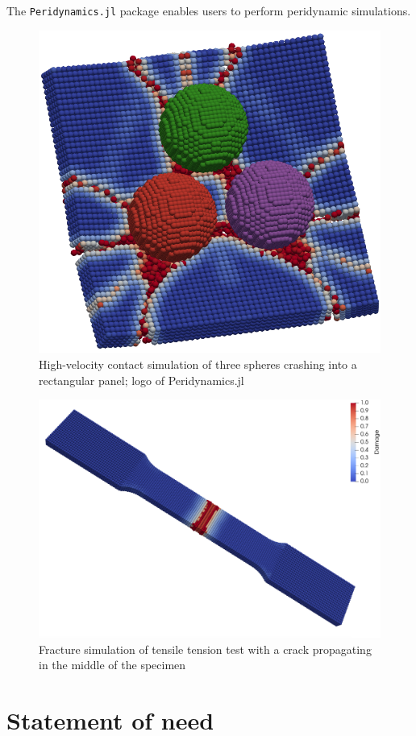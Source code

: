 \documentclass{juliacon}
\begin{document}
The \texttt{Peridynamics.jl} package enables users to perform peridynamic simulations.

\begin{figure}
\centerline{\includegraphics[width=0.8\linewidth]{logo.png}}
\caption{High-velocity contact simulation of three spheres crashing into a rectangular panel; logo of Peridynamics.jl}
\label{fig:logo}
\end{figure}

\begin{figure}
\centerline{\includegraphics[width=0.8\linewidth]{tensile_test.png}}
\caption{Fracture simulation of tensile tension test with a crack propagating in the middle of the specimen}
\label{fig:tensiletest}
\end{figure}

\section{Statement of need}
\end{document}
